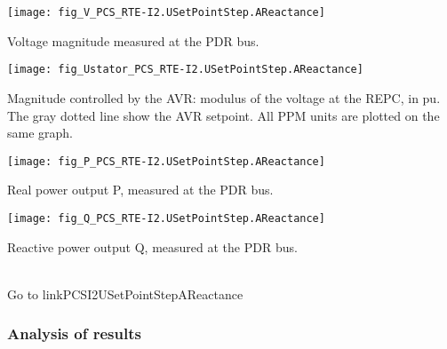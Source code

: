     \noindent
    \begin{minipage}[t]{0.48\textwidth}
        \centering
        \texttt{[image: fig\_V\_PCS\_RTE-I2.USetPointStep.AReactance]}
        \begin{minipage}[t]{0.8\textwidth}
            \small Voltage magnitude measured at the PDR bus.
        \end{minipage}
    \end{minipage}
    \hfill
    \begin{minipage}[t]{0.48\textwidth}
        \centering
        \texttt{[image: fig\_Ustator\_PCS\_RTE-I2.USetPointStep.AReactance]}
        \begin{minipage}[t]{0.8\textwidth}
            \small Magnitude controlled by the AVR: modulus of the voltage at the REPC, in pu.
            The gray dotted line show the AVR setpoint. All PPM units are plotted on the same
            graph.
        \end{minipage}
    \end{minipage}

    \vspace{0.5cm}

    \noindent
    \begin{minipage}[t]{0.48\textwidth}
        \centering
        \texttt{[image: fig\_P\_PCS\_RTE-I2.USetPointStep.AReactance]}
        \begin{minipage}[t]{0.8\textwidth}
            \small Real power output P, measured at the PDR bus.
        \end{minipage}
    \end{minipage}
    \hfill
    \begin{minipage}[t]{0.48\textwidth}
        \centering
        \texttt{[image: fig\_Q\_PCS\_RTE-I2.USetPointStep.AReactance]}
        \begin{minipage}[t]{0.8\textwidth}
            \small Reactive power output Q, measured at the PDR bus.
        \end{minipage}
    \end{minipage}
    \\[2\baselineskip]
    Go to  {{ linkPCSI2USetPointStepAReactance }}

    \subsubsection{Analysis of results}

